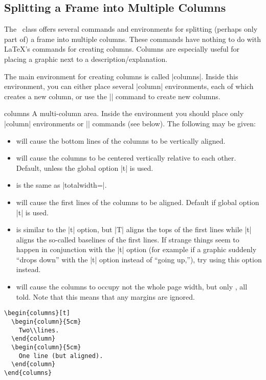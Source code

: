 \subsection{Splitting a Frame into Multiple Columns}

The \beamer\ class offers several commands and environments for splitting (perhaps only part of) a frame into multiple columns. These commands have nothing to do with \LaTeX's commands for creating columns. Columns are especially useful for placing a graphic next to a description/explanation.

The main environment for creating columns is called |columns|. Inside this environment, you can either place several |column| environments, each of which creates a new column, or use the |\column| command to create new columns.

\begin{environment}{{columns}}
  A multi-column area. Inside the environment you should place only |column| environments or |\column| commands (see below). The following  may be given:
  \begin{itemize}
  \item
     will cause the bottom lines of the columns to be vertically aligned.
  \item
     will cause the columns to be centered vertically relative to each other. Default, unless the global option |t| is used.
  \item
     is the same as |totalwidth=\textwidth|.
  \item
     will cause the first lines of the columns to be aligned. Default if global option |t| is used.
  \item
     is similar to the |t| option, but |T| aligns the tops of the first lines while |t| aligns the so-called baselines of the first lines. If strange things seem to happen in conjunction with the |t| option (for example if a graphic suddenly ``drops down'' with the |t| option instead of ``going up,''), try using this option instead.
  \item
     will cause the columns to occupy not the whole page width, but only , all told.
     Note that this means that any margins are ignored.
  \end{itemize}

  \example
\begin{verbatim}
\begin{columns}[t]
  \begin{column}{5cm}
    Two\\lines.
  \end{column}
  \begin{column}{5cm}
    One line (but aligned).
  \end{column}
\end{columns}
\end{verbatim}


\end{environment}

